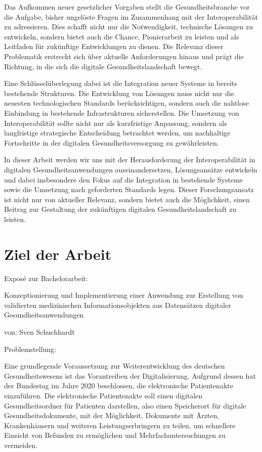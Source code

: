 Das Aufkommen neuer gesetzlicher Vorgaben stellt die Gesundheitsbranche vor die Aufgabe, bisher ungelöste Fragen im Zusammenhang mit der Interoperabilität zu adressieren. Dies schafft nicht nur die Notwendigkeit, technische Lösungen zu entwickeln, sondern bietet auch die Chance, Pionierarbeit zu leisten und als Leitfaden für zukünftige Entwicklungen zu dienen. Die Relevanz dieser Problematik erstreckt sich über aktuelle Anforderungen hinaus und prägt die Richtung, in die sich die digitale Gesundheitslandschaft bewegt.

Eine Schlüsselüberlegung dabei ist die Integration neuer Systeme in bereits bestehende Strukturen. Die Entwicklung von Lösungen muss nicht nur die neuesten technologischen Standards berücksichtigen, sondern auch die nahtlose Einbindung in bestehende Infrastrukturen sicherstellen. Die Umsetzung von Interoperabilität sollte nicht nur als kurzfristige Anpassung, sondern als langfristige strategische Entscheidung betrachtet werden, um nachhaltige Fortschritte in der digitalen Gesundheitsversorgung zu gewährleisten.

In dieser Arbeit werden wir uns mit der Herausforderung der Interoperabilität in digitalen Gesundheitsanwendungen auseinandersetzen, Lösungsansätze entwickeln und dabei insbesondere den Fokus auf die Integration in bestehende Systeme sowie die Umsetzung nach geforderten Standards legen. Dieser Forschungsansatz ist nicht nur von aktueller Relevanz, sondern bietet auch die Möglichkeit, einen Beitrag zur Gestaltung der zukünftigen digitalen Gesundheitslandschaft zu leisten.

%
%
\section{Ziel der Arbeit}
\label{sec:intro:goal}

Exposé zur Bachelorarbeit:

Konzeptionierung und Implementierung einer Anwendung zur Erstellung von validierten medizinischen Informationsobjekten aus Datensätzen digitaler Gesundheitsanwendungen 

von: Sven Schuchhardt

Problemstellung:

Eine grundlegende Voraussetzung zur Weiterentwicklung des deutschen Gesundheitswesens ist das Vorantreiben der Digitalisierung. Aufgrund dessen hat der Bundestag im Jahre 2020 beschlossen, die elektronische Patientenakte einzuführen. Die elektronische Patientenakte soll einen digitalen Gesundheitsordner für Patienten darstellen, also einen Speicherort für digitale Gesundheitsdokumente, mit der Möglichkeit, Dokumente mit Ärzten, Krankenhäusern und weiteren Leistungserbringern zu teilen, um schnellere Einsicht von Befunden zu ermöglichen und Mehrfachuntersuchungen zu vermeiden. 

